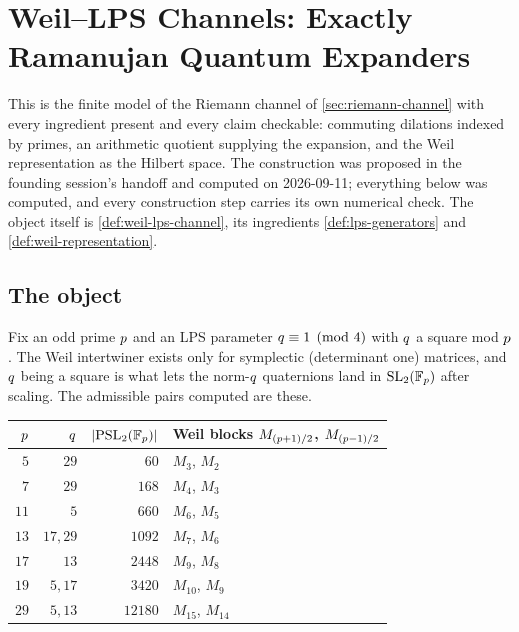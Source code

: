 
\section{Weil--LPS Channels: Exactly Ramanujan Quantum Expanders}
\label{sec:weil-lps}

This is the finite model of the Riemann channel of \cref{sec:riemann-channel}
with every ingredient present and every claim checkable: commuting dilations
indexed by primes, an arithmetic quotient supplying the expansion, and the
Weil representation as the Hilbert space. The construction was proposed in
the founding session's handoff and computed on 2026-09-11; everything below
was computed, and every construction step carries its own numerical check.
The object itself is \cref{def:weil-lps-channel}, its ingredients
\cref{def:lps-generators} and \cref{def:weil-representation}.

\subsection{The object}

Fix an odd prime $p$ and an LPS parameter $q\equiv1\pmod4$ with $q$ a
square mod $p$. The Weil intertwiner exists only for symplectic
(determinant one) matrices, and $q$ being a square is what lets the norm-$q$
quaternions land in $\mathrm{SL}_2(\mathbb F_p)$ after scaling. The admissible pairs computed
are these.

\begin{center}
\begin{tabular}{rrrl}
\toprule
$p$ & $q$ & $\lvert\mathrm{PSL}_2(\mathbb F_p)\rvert$ & Weil blocks $M_{(p+1)/2}$, $M_{(p-1)/2}$ \\
\midrule
$5$  & $29$     & $60$    & $M_3$, $M_2$ \\
$7$  & $29$     & $168$   & $M_4$, $M_3$ \\
$11$ & $5$      & $660$   & $M_6$, $M_5$ \\
$13$ & $17, 29$ & $1092$  & $M_7$, $M_6$ \\
$17$ & $13$     & $2448$  & $M_9$, $M_8$ \\
$19$ & $5, 17$  & $3420$  & $M_{10}$, $M_9$ \\
$29$ & $5, 13$  & $12180$ & $M_{15}$, $M_{14}$ \\
\bottomrule
\end{tabular}
\end{center}

